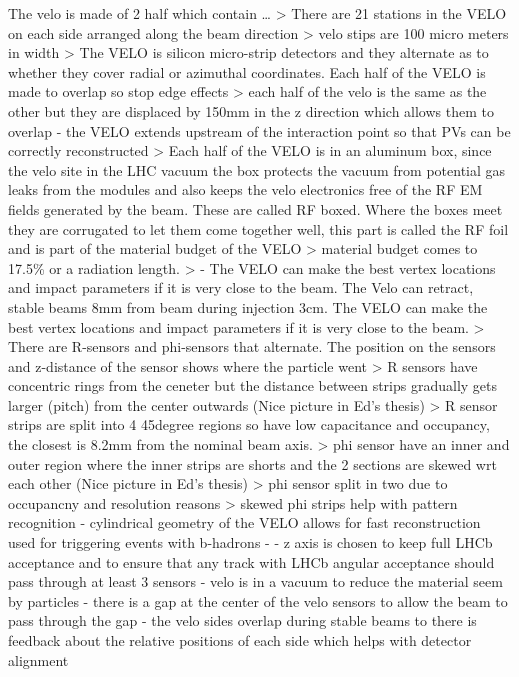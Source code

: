 The velo is made of 2 half which contain …
> There are 21 stations in the VELO on each side arranged along the beam direction
> velo stips are 100 micro meters in width
> The VELO is silicon micro-strip detectors and they alternate as to whether they cover radial or azimuthal coordinates. Each half of the VELO is made to overlap so stop edge effects
> each half of the velo is the same as the other but they are displaced by 150mm in the z direction which allows them to overlap
- the VELO extends upstream of the interaction point so that PVs can be correctly reconstructed
> Each half of the VELO is in an aluminum box, since the velo site in the LHC vacuum the box protects the vacuum from potential gas leaks from the modules and also keeps the velo electronics free of the RF EM fields generated by the beam. These are called RF boxed. Where the boxes meet they are corrugated to let them come together well, this part is called the RF foil and is part of the material budget of the VELO
> material budget comes to 17.5\% or a radiation length.
> - The VELO can make the best vertex locations and impact parameters if it is very close to the beam. The Velo can retract, stable beams 8mm from beam during injection 3cm. The VELO can make the best vertex locations and impact parameters if it is very close to the beam.
> There are R-sensors and phi-sensors that alternate. The position on the sensors and z-distance of the sensor shows where the particle went
> R sensors have concentric rings from the ceneter but the distance between strips gradually gets larger (pitch) from the center outwards (Nice picture in Ed's thesis)
> R sensor strips are split into 4 45degree regions so have low capacitance and occupancy, the closest is 8.2mm from the nominal beam axis.
> phi sensor have an inner and outer region where the inner strips are shorts and the 2 sections are skewed wrt each other (Nice picture in Ed's thesis)
> phi sensor split in two due to occupancny and resolution reasons
> skewed phi strips help with pattern recognition
- cylindrical geometry of the VELO allows for fast reconstruction used for triggering events with b-hadrons
- - z axis is chosen to keep full LHCb acceptance and to ensure that any track with LHCb angular acceptance should pass through at least 3 sensors
- velo is in a vacuum to reduce the material seem by particles
- there is a gap at the center of the velo sensors to allow the beam to pass through the gap
- the velo sides overlap during stable beams to there is feedback about the relative positions of each side which helps with detector alignment


